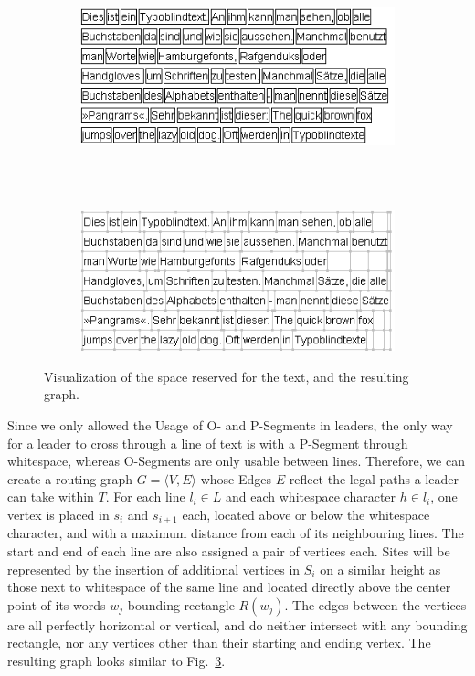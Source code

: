 \documentclass[11pt,a4paper]{vutinfth}
\begin{document}
\begin{figure}
 \centering
 \begin{subfigure}[b]{\textwidth}
 \centering
  \includegraphics[]{WordBoundaries.png}
  \caption{\label{fig:wbound}}
 \end{subfigure}
 \\
 ~\\%
 \begin{subfigure}[b]{\textwidth}
 \centering
  \includegraphics[]{RoutingGraph_edited.png}
  \caption{\label{fig:rgraph}}
 \end{subfigure}
 \caption{Visualization of the space reserved for the text, and the resulting graph.}
\end{figure}

Since we only allowed the Usage of O- and P-Segments in leaders, the only way for a leader to cross through a line of text is with a P-Segment through whitespace, whereas O-Segments are only usable between lines. Therefore, we can create a routing graph $G=\langle V,E\rangle$ whose Edges $E$ reflect the legal paths a leader can take within $T$.
For each line $l_i \in L$ and each whitespace character $h \in l_i$, one vertex is placed in $s_i$ and $s_{i+1}$ each, located above or below the whitespace character, and with a maximum distance from each of its neighbouring lines. The start and end of each line are also assigned a pair of vertices each. Sites will be represented by the insertion of additional vertices in $S_i$ on a similar height as those next to whitespace of the same line and located directly above the center point of its words $w_j$ bounding rectangle $R(w_j)$. The edges between the vertices are all perfectly horizontal or vertical, and do neither intersect with any bounding rectangle, nor any vertices other than their starting and ending vertex. The resulting graph looks similar to Fig.~\ref{fig:rgraph}.
\end{document}
